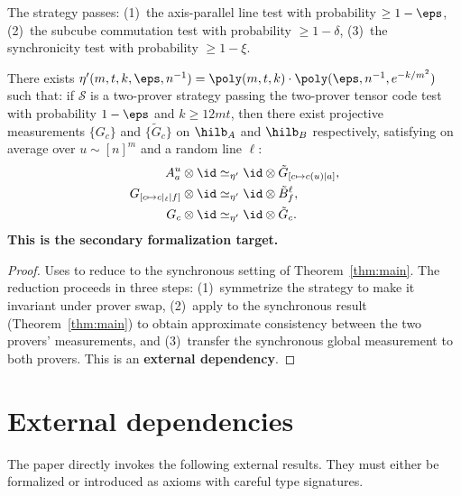 \begin{definition}\label{def:good-2}
  The strategy passes:
  (1)~the axis-parallel line test with probability $\ge 1-\eps$,
  (2)~the subcube commutation test with probability $\ge 1-\delta$,
  (3)~the synchronicity test with probability $\ge 1-\xi$.
\end{definition}

\begin{theorem}\label{thm:main-bipartite}
  There exists
  $\eta'(m,t,k,\eps,n^{-1})=\poly(m,t,k)\cdot\poly(\eps,n^{-1},e^{-k/m^2})$
  such that: if $\mathcal{S}$ is a two-prover strategy passing the two-prover
  tensor code test with probability $1-\eps$ and $k\ge 12mt$, then there
  exist projective measurements $\{G_c\}$ and $\{\tilde G_c\}$ on
  $\hilb_A$ and $\hilb_B$ respectively, satisfying on average over
  $u\sim[n]^m$ and a random line $\ell$:
  \begin{align*}
    A^u_a\otimes\id &\simeq_{\eta'}\id\otimes\tilde G_{[c\mapsto c(u)\mid a]},\\
    G_{[c\mapsto c|_\ell\mid f]}\otimes\id &\simeq_{\eta'}\id\otimes\tilde B^\ell_f,\\
    G_c\otimes\id &\simeq_{\eta'}\id\otimes\tilde G_c.
  \end{align*}
  \textbf{This is the secondary formalization target.}
\end{theorem}
\begin{proof}
  Uses \cite[Corollary~4.1]{vidick2021almost} to reduce to the synchronous
  setting of Theorem~\ref{thm:main}.
  The reduction proceeds in three steps:
  (1)~symmetrize the strategy to make it invariant under prover swap,
  (2)~apply \cite[Corollary~4.1]{vidick2021almost} to the synchronous
  result (Theorem~\ref{thm:main}) to obtain approximate consistency between
  the two provers' measurements, and
  (3)~transfer the synchronous global measurement to both provers.
  This is an \textbf{external dependency}.
\end{proof}


\chapter{External dependencies}
\label{chap:external}

The paper directly invokes the following external results. They must either be
formalized or introduced as axioms with careful type signatures.

